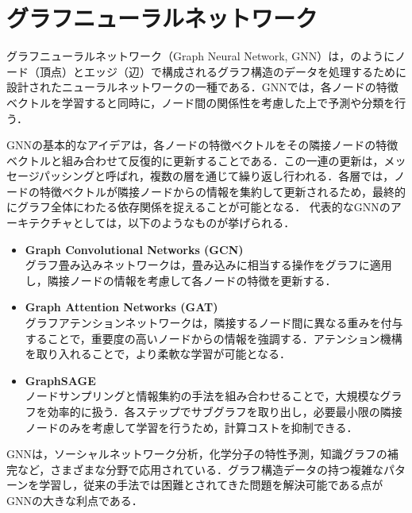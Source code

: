 
\section{グラフニューラルネットワーク}
グラフニューラルネットワーク（Graph Neural Network, GNN）は，のようにノード（頂点）とエッジ（辺）で構成されるグラフ構造のデータを処理するために設計されたニューラルネットワークの一種である．GNNでは，各ノードの特徴ベクトルを学習すると同時に，ノード間の関係性を考慮した上で予測や分類を行う．

GNNの基本的なアイデアは，各ノードの特徴ベクトルをその隣接ノードの特徴ベクトルと組み合わせて反復的に更新することである．この一連の更新は，メッセージパッシングと呼ばれ，複数の層を通じて繰り返し行われる．各層では，ノードの特徴ベクトルが隣接ノードからの情報を集約して更新されるため，最終的にグラフ全体にわたる依存関係を捉えることが可能となる．
代表的なGNNのアーキテクチャとしては，以下のようなものが挙げられる．
\begin{itemize}
  \item \textbf{Graph Convolutional Networks (GCN)} \cite{kipf2016semi-gcn}\\
  グラフ畳み込みネットワークは，畳み込みに相当する操作をグラフに適用し，隣接ノードの情報を考慮して各ノードの特徴を更新する．
  \item \textbf{Graph Attention Networks (GAT)} \cite{velickovic2017graph-gat}\\
  グラフアテンションネットワークは，隣接するノード間に異なる重みを付与することで，重要度の高いノードからの情報を強調する．アテンション機構を取り入れることで，より柔軟な学習が可能となる．
  \item \textbf{GraphSAGE} \cite{hamilton2017inductive-graph-sage}\\
  ノードサンプリングと情報集約の手法を組み合わせることで，大規模なグラフを効率的に扱う．各ステップでサブグラフを取り出し，必要最小限の隣接ノードのみを考慮して学習を行うため，計算コストを抑制できる．
\end{itemize}

GNNは，ソーシャルネットワーク分析，化学分子の特性予測，知識グラフの補完など，さまざまな分野で応用されている．グラフ構造データの持つ複雑なパターンを学習し，従来の手法では困難とされてきた問題を解決可能である点がGNNの大きな利点である．


\newpage
